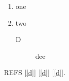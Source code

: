 \documentclass{article}
\begin{document}
\begin{enumerate}
\item one
\item two
  \begin{description}
  \item[D] dee\label{d}
  \end{description}
\end{enumerate}
REFS [\ref{d}] [\autoref{d}] [\cref{d}].
\end{document}

